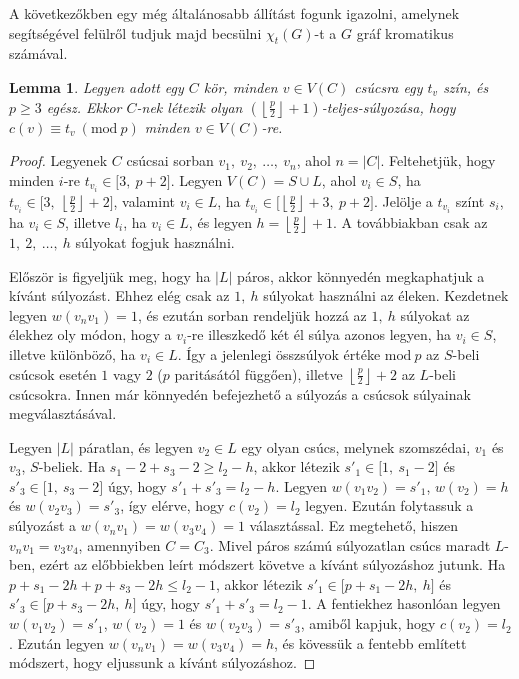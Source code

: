 \documentclass[12pt, a4paper]{report}
\newtheorem{lem}[tét]{Lemma}
\theoremstyle{remark}
\theoremstyle{definition}
\begin{document}
A következőkben egy még általánosabb állítást fogunk igazolni, amelynek segítségével felülről tudjuk majd becsülni $\chi_t(G)$-t a $G$ gráf kromatikus számával.

\begin{lem} \label{lem:totalcircle}
Legyen adott egy $C$ kör, minden $v \in V(C)$ csúcsra egy $t_v$ szín, és $p \geq 3$ egész. Ekkor $C$-nek létezik olyan $\left( \left\lfloor \frac{p}{2} \right\rfloor + 1 \right)$-teljes-súlyozása, hogy $c(v) ≡ t_v\ (\mathrm{mod}\ p)$ minden $v \in V(C)$-re.
\end{lem}

\begin{proof}
Legyenek $C$ csúcsai sorban $v_1,\ v_2,\ \ldots,\ v_n$, ahol $n = |C|$. Feltehetjük, hogy minden $i$-re $t_{v_i} \in \lbrack 3,\ p + 2 \rbrack$. Legyen $V(C) = S \cup L$, ahol $v_i \in S$, ha $t_{v_i} \in \lbrack 3,\ \left\lfloor \frac{p}{2} \right\rfloor + 2 \rbrack$, valamint $v_i \in L$, ha $t_{v_i} \in \lbrack \left\lfloor \frac{p}{2} \right\rfloor + 3,\ p + 2 \rbrack$. Jelölje a $t_{v_i}$ színt $s_i$, ha $v_i \in S$, illetve $l_i$, ha $v_i \in L$, és legyen $h = \left\lfloor \frac{p}{2} \right\rfloor + 1$. A továbbiakban csak az $1,\ 2,\ \ldots,\ h$ súlyokat fogjuk használni. 

Először is figyeljük meg, hogy ha $|L|$ páros, akkor könnyedén megkaphatjuk a kívánt súlyozást. Ehhez elég csak az $1,\ h$ súlyokat használni az éleken. Kezdetnek legyen $w(v_n v_1) = 1$, és ezután sorban rendeljük hozzá az $1,\ h$ súlyokat az élekhez oly módon, hogy a $v_i$-re illeszkedő két él súlya azonos legyen, ha $v_i \in S$, illetve különböző, ha $v_i \in L$. Így a jelenlegi összsúlyok értéke $\mathrm{mod}\ p$ az $S$-beli csúcsok esetén $1$ vagy $2$ ($p$ paritásától függően), illetve $\left\lfloor \frac{p}{2} \right\rfloor + 2$ az $L$-beli csúcsokra. Innen már könnyedén befejezhető a súlyozás a csúcsok súlyainak megválasztásával.

Legyen $|L|$ páratlan, és legyen $v_2 \in L$ egy olyan csúcs, melynek szomszédai, $v_1$ és $v_3$, $S$-beliek. Ha $s_1 - 2 + s_3 - 2 \geq l_2 - h$, akkor létezik $s'_1 \in \lbrack 1,\ s_1 - 2 \rbrack$ és $s'_3 \in \lbrack 1,\ s_3 - 2 \rbrack$ úgy, hogy $s'_1 + s'_3 = l_2 - h$. Legyen $w(v_1 v_2) = s'_1$, $w(v_2) = h$ és $w(v_2 v_3) = s'_3$, így elérve, hogy $c(v_2) = l_2$ legyen. Ezután folytassuk a súlyozást a $w(v_n v_1) = w(v_3 v_4) = 1$ választással. Ez megtehető, hiszen $v_n v_1 = v_3 v_4$, amennyiben $C = C_3$. Mivel páros számú súlyozatlan csúcs maradt $L$-ben, ezért az előbbiekben leírt módszert követve a kívánt súlyozáshoz jutunk. Ha $p + s_1 - 2h + p + s_3 - 2h \leq l_2 - 1$, akkor létezik $s'_1 \in \lbrack p + s_1 - 2h,\ h \rbrack$ és $s'_3 \in \lbrack p + s_3 - 2h,\ h \rbrack$ úgy, hogy $s'_1 + s'_3 = l_2 - 1$. A fentiekhez hasonlóan legyen $w(v_1 v_2)= s'_1$, $w(v_2) = 1$ és $w(v_2 v_3) = s'_3$, amiből kapjuk, hogy $c(v_2) = l_2$. Ezután legyen $w(v_n v_1) = w(v_3 v_4) = h$, és kövessük a fentebb említett módszert, hogy eljussunk a kívánt súlyozáshoz.


\end{proof}
\end{document}
